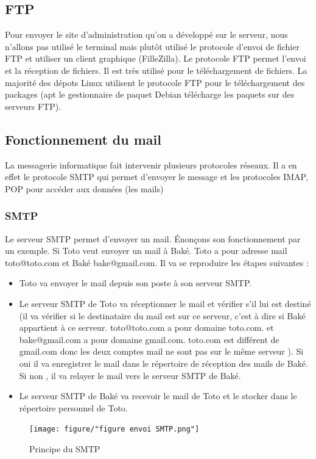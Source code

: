 \documentclass[a4paper,12pt,french]{report} %
\begin{document}
\subsection{FTP} 
Pour envoyer le site d'administration qu'on a développé sur le serveur, nous n'allons pas utilisé le terminal mais plutôt utilisé le protocole d'envoi de fichier FTP et utiliser un client graphique (FilleZilla). 
Le protocole FTP permet l'envoi et la réception de fichiers. Il est très utilisé pour le téléchargement de fichiers. La majorité des dépots Linux utilisent le protocole FTP pour le téléchargement des packages (apt le gestionnaire de paquet Debian télécharge les paquets sur des serveurs FTP).
\subsection{Fonctionnement du mail}
La messagerie informatique fait intervenir plusieurs protocoles réseaux. Il a en effet le protocole SMTP qui permet d'envoyer le message et les protocoles IMAP, POP pour accéder aux données (les mails)
\subsubsection{SMTP}
Le serveur SMTP permet d'envoyer un mail. Énonçons son fonctionnement par un exemple. Si Toto veut envoyer un mail à Baké. Toto a pour adresse mail toto@toto.com et Baké bake@gmail.com. Il va se reproduire les étapes suivantes :
\begin{itemize}
	\item Toto va envoyer le mail depuis son poste à son serveur SMTP. 
	\item Le serveur SMTP de Toto va réceptionner le mail et vérifier s'il lui est destiné (il va vérifier si le destinataire du mail est sur ce serveur, c'est à dire si Baké appartient à ce serveur. toto@toto.com a pour domaine toto.com. et bake@gmail.com a pour domaine gmail.com. toto.com est différent de gmail.com donc les deux comptes mail ne sont pas sur le même serveur ). Si oui il va enregistrer le mail dans le répertoire de réception des mails de Baké. Si non , il va relayer le mail vers le serveur SMTP de Baké. 
	\item Le serveur SMTP de Baké va recevoir le mail de Toto et le stocker dans le répertoire personnel de Toto.	   
\end{itemize}
\begin{figure}[H]
\centering
\texttt{[image: figure/"figure envoi SMTP.png"]}
\caption{Principe du SMTP}
\label{Principer du SMTP}
\end{figure}
\end{document}
